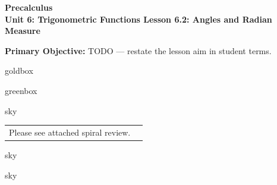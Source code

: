 \documentclass[10pt]{article}
\newcommand{\CourseName}{Precalculus}
\newcommand{\UnitNumberName}{Unit 6: Trigonometric Functions \quad}
\newcommand{\LessonNumberName}{Lesson 6.2: Angles and Radian Measure}
\begin{document}
\begin{center}
    {\Large\bfseries \CourseName \\
    {\small\bfseries \UnitNumberName \LessonNumberName}}
\end{center}

\begin{tcolorbox}[colback=sky, colframe=navy, boxrule=0.9pt, arc=2mm,
    left=2mm, right=2mm, top=1.5mm, bottom=1.5mm]
    \textbf{Primary Objective:} TODO --- restate the lesson aim in student terms.
\end{tcolorbox}

\renewcommand{\arraystretch}{1.6}
\begin{skillbox}{goldbox}
\end{skillbox}

\begin{skillbox}{greenbox}
\end{skillbox}

\begin{skillbox}{sky}
    \begin{tabularx}{\linewidth}{@{}X c@{}}
        \begin{minipage}[t]{0.55\linewidth}\vspace{0pt}
            Please see attached spiral review.  %
        \end{minipage}
        &
        \begin{minipage}[t]{0.38\linewidth}\vspace{0pt}\centering
        \end{minipage}
    \end{tabularx}
\end{skillbox}

\begin{skillbox}[Hook]{sky}
\end{skillbox}

\begin{skillbox}[Lesson]{sky}
\end{skillbox}
\end{document}
